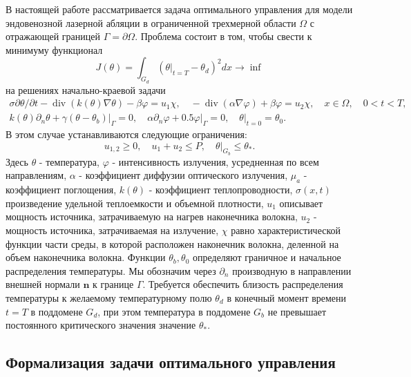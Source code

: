В настоящей работе рассматривается задача оптимального управления для модели
эндовенозной лазерной абляции в ограниченной трехмерной области
$\Omega$ с отражающей границей $\Gamma=\partial\Omega$.
Проблема состоит в том, чтобы свести к минимуму функционал
\[
    J(\theta)=\int_{G_{d}}\left(\left.\theta\right|_{t=T}-\theta_{d}\right)^{2} d x \rightarrow \inf
\]
на решениях начально-краевой задачи
\[
    \begin{gathered}
        \sigma \partial \theta / \partial t-\operatorname{div}(k(\theta) \nabla \theta)-\beta \varphi=u_{1} \chi,
        \quad-\operatorname{div}(\alpha \nabla \varphi)+\beta \varphi=u_{2} \chi, \quad x \in \Omega, \quad 0<t<T, \\
        k(\theta) \partial_{n} \theta+\left.\gamma\left(\theta-\theta_{b}\right)\right|_{\Gamma}=0,
        \quad \alpha \partial_{n} \varphi+\left.0.5 \varphi\right|_{\Gamma}=0,\left.\quad \theta\right|_{t=0}=\theta_{0}.
    \end{gathered}
\]
В этом случае устанавливаются следующие ограничения:
\[
    u_{1,2} \geq 0, \quad u_{1}+u_{2} \leq P,\left.\quad \theta\right|_{G_{b}} \leq \theta_{*}.
\]
Здесь $\theta$ - температура, $\varphi$ - интенсивность излучения, усредненная по всем направлениям,
$\alpha$ - коэффициент диффузии оптического излучения, $\mu_{a}$ - коэффициент поглощения,
$k(\theta)$ - коэффициент теплопроводности, $\sigma(x, t)$ произведение удельной теплоемкости
и объемной плотности, $u_{1}$ описывает мощность источника, затрачиваемую
на нагрев наконечника волокна, $u_{2}$ - мощность источника, затрачиваемая на излучение,
$\chi$ равно характеристической функции части среды, в которой расположен наконечник волокна,
деленной на объем наконечника волокна.
Функции $\theta_{b}, \theta_{0}$ определяют граничное и начальное распределения температуры.
Мы обозначим через $\partial_{n}$ производную в направлении внешней нормали $\mathbf{n}$ к границе $\Gamma$.
Требуется обеспечить близость распределения температуры к желаемому температурному полю $\theta_{d}$
в конечный момент времени $t=T$ в поддомене $G_{d}$, при этом температура в поддомене $G_{b}$
не превышает постоянного критического значения значение $\theta_{*}$.

\subsection{Формализация задачи оптимального управления}

